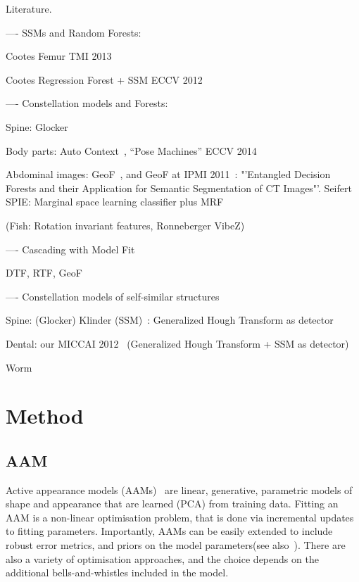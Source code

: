 \documentclass[10pt,twocolumn,letterpaper]{article}
\begin{document}
Literature.

---- SSMs and Random Forests:

Cootes Femur TMI 2013~\cite{CootesFemurTMI2013}

Cootes Regression Forest + SSM ECCV 2012~\cite{CootesECCV2012RRFandSSM}

---- Constellation models and Forests:

Spine: Glocker~\cite{Glocker2013}

Body parts: Auto Context~\cite{AutoContext2008}, "`Pose Machines"' ECCV 2014~\cite{PoseMachinesECCV2014}

Abdominal images: GeoF~\cite{GeoForests2013}, and GeoF at IPMI 2011~\cite{CriminisiAbdominalIPMI2011}: "'Entangled Decision Forests and their Application for Semantic Segmentation of CT Images"'. Seifert SPIE: Marginal space learning classifier plus MRF~\cite{SeifertAnatomicalSPIE2009} 

(Fish: Rotation invariant features, Ronneberger VibeZ)

---- Cascading with Model Fit

DTF, RTF, GeoF

---- Constellation models of self-similar structures

Spine: (Glocker) Klinder (SSM)~\cite{Klinder2009471}: Generalized Hough Transform as detector

Dental: our MICCAI 2012~\cite{TeethMICCAI2012} (Generalized Hough Transform + SSM as detector)

Worm~\cite{WormMiccai2014}

\section{Method}

\subsection{AAM}
Active appearance models (AAMs)~\cite{CootesAAM2001} are linear, generative, parametric models of shape and appearance that are learned (PCA) from training data.  Fitting an AAM is a non-linear optimisation problem, that is done via incremental updates to fitting parameters.  Importantly, AAMs can be easily extended to include robust error metrics, and priors on the model parameters(see also~\cite{BakerAAM2004}).  There are also a variety of optimisation approaches, and the choice depends on the additional bells-and-whistles included in the model.
\end{document}
